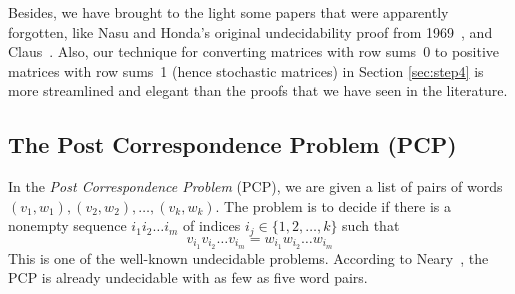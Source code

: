 \documentclass[a4paper,cleveref, autoref, thm-restate]{lipics-v2021}
\begin{document}
 








\fi




Besides, %
we have brought to the light some papers that were apparently
forgotten, like
Nasu and Honda's original undecidability proof from 1969~\cite{NasuHonda1969},
and Claus~\cite{claus81}.
Also, our technique for converting matrices with row sums~0 to positive matrices
with row sums~1 (hence stochastic matrices) in Section
\ref{sec:step4} %
is more streamlined and elegant than the proofs that we have seen in
the literature.


\fi


\subsection{The Post Correspondence Problem (PCP)}
\label{sec:PCP-intro}

In the \emph{Post Correspondence Problem} (PCP),
we are given a list of pairs of words $(v_1,w_1),
\allowbreak
(v_2,w_2), \ldots,
(v_k,w_k)$. 
 The problem is to decide if there is a nonempty sequence
$i_1i_2\ldots i_m$
of indices $i_j \in \{1,2,\ldots,k\}$ such that
\begin{displaymath}
  v_{i_1}v_{i_2}\ldots v_{i_m}
=  w_{i_1}w_{i_2}\ldots w_{i_m}
\end{displaymath}
This is one of the well-known undecidable problems.
%
According to Neary~\cite{neary:PCP5:2015},
 the PCP is already undecidable with as few as five
 word pairs.

\end{document}
